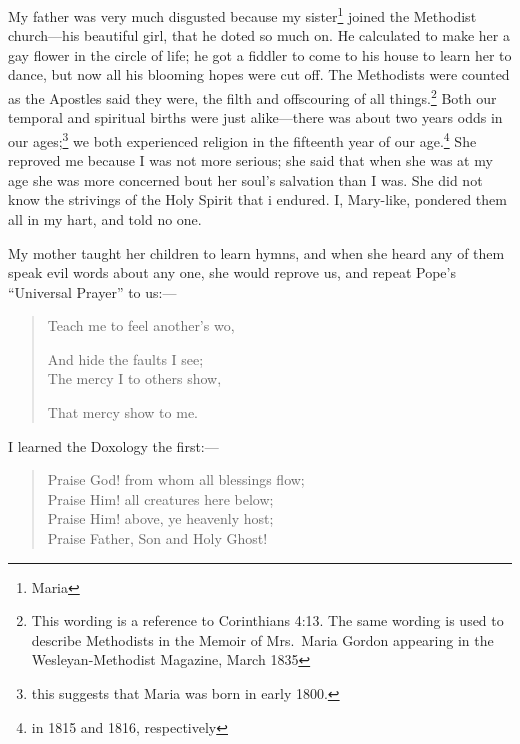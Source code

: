 My father was very much disgusted because my sister\footnote{Maria} joined the Methodist church---his beautiful girl, that he doted so much on.
He calculated to make her a gay flower in the circle of life; he got a fiddler to come to his house to learn her to dance, but now all his blooming hopes were cut off.
The Methodists were counted as the Apostles said they were, the filth and offscouring of all things.\footnote{This wording is a reference to Corinthians 4:13. The same wording is used to describe Methodists in the Memoir of Mrs.\ Maria Gordon appearing in the Wesleyan-Methodist Magazine, March 1835}
Both our temporal and spiritual births were just alike---there was about two years odds in our ages;\footnote{this suggests that Maria was born in early 1800.} we both experienced religion in the fifteenth year of our age.\footnote{in 1815 and 1816, respectively}
She reproved me because I was not more serious; she said that when she was at my age she was more concerned bout her soul's salvation than I was.
She did not know the strivings of the Holy Spirit that i endured.
I, Mary-like, pondered them all in my hart, and told no one.

My mother taught her children to learn hymns, and when she heard any of them speak evil words about any one, she would reprove us, and repeat Pope's ``Universal Prayer'' to us:---
\begin{quote}
\setlength{\parindent}{2ex}
    Teach me to feel another's wo,
    \setlength{\parskip}{0pt}
    \par And hide the faults I see;\\
    The mercy I to others show,
    \par That mercy show to me.
\end{quote}

I learned the Doxology the first:---
\begin{quote}
    Praise God! from whom all blessings flow;\\
    Praise Him! all creatures here below;\\
    Praise Him! above, ye heavenly host;\\
    Praise Father, Son and Holy Ghost!
\end{quote}

